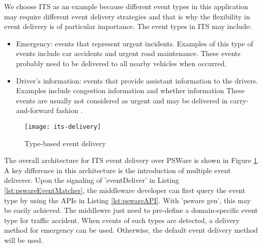 We choose ITS as an example because different event types in this application may require different event delivery strategies and that is why the flexibility in event delivery is of particular importance. The event types in ITS may include:
\begin{itemize}
\item Emergency: events that represent urgent incidents. Examples of this type of events include car accidents and urgent road maintenance. These events probably need to be delivered to all nearby vehicles when occurred.
\item Driver's information: events that provide assistant information to the drivers. Examples include congestion information and whether information These events are usually not considered as urgent and may be delivered in carry-and-forward fashion \cite{cartel}.
\end{itemize}

\begin{figure}
\centering
\texttt{[image: its-delivery]}
\caption{Type-based event delivery}
\label{fig:its-delivery}
\end{figure}

The overall architecture for ITS event delivery over PSWare is shown in Figure \ref{fig:its-delivery}. A key difference in this architecture is the introduction of multiple event deliverer. Upon the signaling of 'eventDeliver' in Listing \ref{lst:pswareEventMatcher}, the middleware developer can first query the event type by using the APIs in Listing \ref{lst:pswareAPI}. With 'psware gen', this may be easily achieved. The middlewre just need to pre-define a domain-specific event type for traffic accident. When events of such types are detected, a delivery method for emergency can be used. Otherwise, the default event delivery method will be used.
